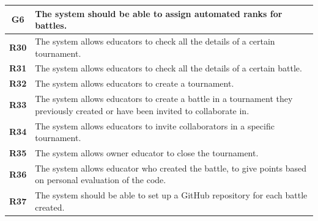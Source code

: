 \documentclass[12pt, a4paper]{report}
\begin{document}
    \begin{table}[H]
        \begin{tabularx}{\textwidth}{cX}
        \textbf{G6}   & The system should be able to assign automated ranks for battles.                                                                \\ \hline
        \textbf{R30}  & The system allows educators to check all the details of a certain tournament.                                                   \\
        \textbf{R31}  & The system allows educators to check all the details of a certain battle.                                                       \\
        \textbf{R32}  & The system allows educators to create a tournament.                                                                             \\
        \textbf{R33}  & The system allows educators to create a battle in a tournament they previously created or have been invited to collaborate in.  \\
        \textbf{R34}  & The system allows educators to invite collaborators in a specific tournament.                                                   \\
        \textbf{R35}  & The system allows owner educator to close the tournament.                                                                       \\
        \textbf{R36}  & The system allows educator who created the battle, to give points based on personal evaluation of the code.                     \\
        \textbf{R37}  & The system should be able to set up a GitHub repository for each battle created.                                                \\                                              
        \end{tabularx}
    \end{table}
\end{document}
